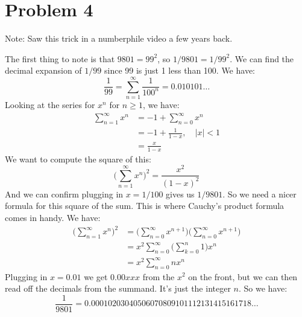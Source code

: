 \documentclass{article}
\begin{document}
    \section*{Problem 4}
        Note: Saw this trick in a numberphile video a few years back.
        \par\hfill\par\noindent
        The first thing to note is that $9801=99^{2}$, so $1/9801=1/99^{2}$. We can find
        the decimal expansion of $1/99$ since 99 is just 1 less than 100. We have:
        \begin{equation}
            \frac{1}{99}=\sum_{n=1}^{\infty}\frac{1}{100^{n}}=0.010101\dots
        \end{equation}
        Looking at the series for $x^{n}$ for $n\geq{1}$, we have:
        \begin{subequations}
            \begin{align}
                \sum_{n=1}^{\infty}x^{n}
                &=-1+\sum_{n=0}^{\infty}x^{n}\\
                &=-1+\frac{1}{1-x},\quad|x|<1\\
                &=\frac{x}{1-x}
            \end{align}
        \end{subequations}
        We want to compute the square of this:
        \begin{equation}
            \Big(\sum_{n=1}^{\infty}x^{n}\Big)^{2}=\frac{x^{2}}{(1-x)^{2}}
        \end{equation}
        And we can confirm plugging in $x=1/100$ gives us $1/9801$. So we need a nicer formula
        for this square of the sum. This is where Cauchy's product formula comes in handy. We
        have:
        \begin{subequations}
            \begin{align}
                \Big(\sum_{n=1}^{\infty}x^{n}\Big)^{2}
                    &=\Big(\sum_{n=0}^{\infty}x^{n+1}\Big)
                        \Big(\sum_{n=0}^{\infty}x^{n+1}\Big)\\
                    &=x^{2}\sum_{n=0}^{\infty}\Big(\sum_{k=0}^{n}1\Big)x^{n}\\
                    &=x^{2}\sum_{n=0}^{\infty}nx^{n}
            \end{align}
        \end{subequations}
        Plugging in $x=0.01$ we get $0.00xxx$ from the $x^{2}$ on the front, but we
        can then read off the decimals from the summand. It's just the integer $n$.
        So we have:
        \begin{equation}
            \frac{1}{9801}=0.00010203040506070809101112131415161718\dots
        \end{equation}
\end{document}
